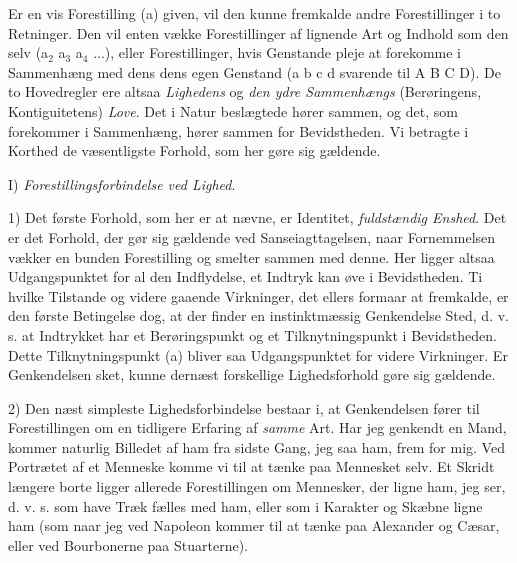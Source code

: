 \documentclass[12pt,a4paper,openany]{book}
\newcommand{\opage}[1]{\marginnote{\footnotesize\textit{[#1]}}}
\begin{document}
Er en vis Forestilling (a) given, vil den kunne fremkalde andre
Forestillinger i to Retninger. Den vil enten vække Forestillinger af
lignende Art og Indhold som den selv (a$_{2}$ a$_{3}$ a$_{4}$ ...),
eller Forestillinger, hvis Genstande pleje at forekomme i Sammenhæng med
dens dens egen Genstand (a b c d svarende til A B C D). De to
Hovedregler ere altsaa \emph{Lighedens} og \emph{den ydre Sammenhængs}
(Berøringens, Kontiguitetens) \emph{Love}. Det i Natur beslægtede hører
sammen, og det, som forekommer i Sammenhæng, hører sammen for
Bevidstheden. Vi betragte i Korthed de væsentligste Forhold, som her
gøre sig gældende.

I) \emph{Forestillingsforbindelse ved Lighed}.

1) Det første Forhold, som her er at nævne, er Identitet,
\emph{fuldstændig Enshed}. Det er det Forhold, der gør sig gældende ved
Sanseiagttagelsen, naar Fornemmelsen vækker en bunden Forestilling og
smelter sammen med denne. Her ligger altsaa Udgangspunktet for al den
Indflydelse, et Indtryk kan øve i Bevidstheden. Ti hvilke Tilstande og
videre gaaende Virkninger, det ellers formaar at fremkalde, er den
første Betingelse dog, at der finder en instinktmæssig Genkendelse Sted,
d. v. s. at Indtrykket har et Berøringspunkt og et Tilknytningspunkt i
Bevidstheden. Dette Tilknytningspunkt (a) bliver saa Udgangspunktet for
videre Virkninger. Er Genkendelsen sket, kunne dernæst forskellige
Lighedsforhold gøre sig gældende.

2) Den næst simpleste Lighedsforbindelse bestaar i, at Genkendelsen
fører til Forestillingen om en tidligere Erfaring af \emph{samme} Art.
Har jeg genkendt en Mand, kommer naturlig
\opage{188}Billedet af ham fra sidste Gang, jeg saa ham, frem for mig.
Ved Portrætet af et Menneske komme vi til at tænke paa Mennesket selv.
Et Skridt længere borte ligger allerede Forestillingen om Mennesker, der
ligne ham, jeg ser, d. v. s. som have Træk fælles med ham, eller som i
Karakter og Skæbne ligne ham (som naar jeg ved Napoleon kommer til at
tænke paa Alexander og Cæsar, eller ved Bourbonerne paa Stuarterne).
\end{document}

